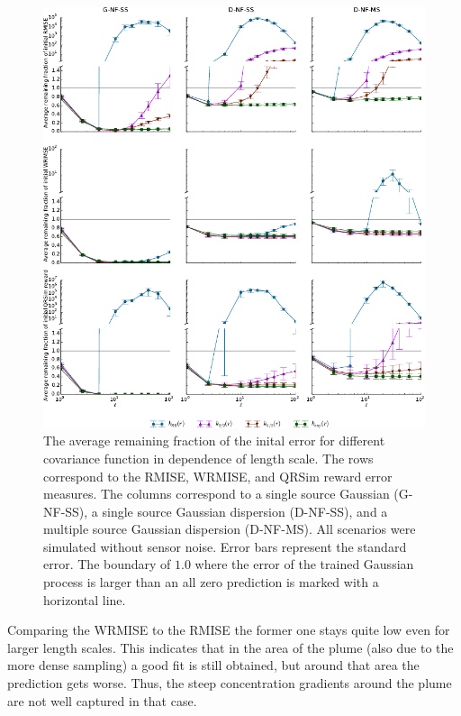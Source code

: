 \begin{figure}
    \centering
    \includegraphics{plots/lengthscales}
    \caption[Influence of the length scale of the covariance functions]{The 
        average remaining fraction of the inital error for different covariance 
        function in dependence of length scale.  The rows correspond to the 
        RMISE, WRMISE, and QRSim reward error measures.  The columns correspond 
        to a single source Gaussian (G-NF-SS), a single source Gaussian 
        dispersion (D-NF-SS), and a multiple source Gaussian dispersion 
        (D-NF-MS). All scenarios were simulated without sensor noise.  Error 
        bars represent the standard error. The boundary of $1.0$ where the error 
        of the trained Gaussian process is larger than an all zero prediction is 
        marked with a horizontal line.}\label{fig:lengthscales}
\end{figure}

Comparing the WRMISE to the RMISE the former one stays quite low even for larger 
length scales. This indicates that in the area of the plume (also due to the more 
dense sampling) a good fit is still obtained, but around that area the 
prediction gets worse. Thus, the steep concentration gradients around the plume 
are not well captured in that case.

